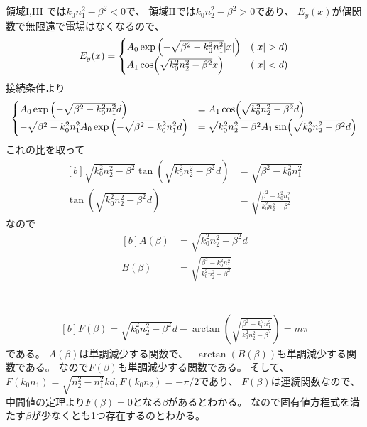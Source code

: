 \documentclass[../ap_2013.tex]{subfiles}
\begin{document}
\section{}
領域I,III では\(k_0n_1^2-\beta^2 <0\)で、
領域IIでは\(k_0n_2^2-\beta^2 >0\)であり、
\(E_y(x)\)が偶関数で無限遠で電場はなくなるので、
\begin{equation}\begin{aligned}[b]
    E_y(x) =
    \begin{cases}
        A_0\exp\qty(-\sqrt{\beta^2-k_0^2n_1^2}\abs{x})& (\abs{x}>d)\\
        A_1\cos(\sqrt{k_0^2n_2^2-\beta^2}x) & (\abs{x}<d)
    \end{cases}
\end{aligned}\end{equation}
接続条件より
\begin{equation}\begin{aligned}[b]
    \begin{cases}
        A_0\exp\qty(-\sqrt{\beta^2-k_0^2n_1^2}d) &= A_1\cos(\sqrt{k_0^2n_2^2-\beta^2}d)\\
        -\sqrt{\beta^2-k_0^2n_1^2}A_0\exp\qty(-\sqrt{\beta^2-k_0^2n_1^2}d) &= \sqrt{k_0^2n_2^2-\beta^2}A_1\sin(\sqrt{k_0^2n_2^2-\beta^2}d)
    \end{cases}
\end{aligned}\end{equation}
これの比を取って
\begin{equation}\begin{aligned}[b]
    \sqrt{k_0^2n_2^2-\beta^2}\tan(\sqrt{k_0^2n_2^2-\beta^2}d) &=\sqrt{\beta^2-k_0^2n_1^2}\\
    \tan(\sqrt{k_0^2n_2^2-\beta^2}d) &= \sqrt{\frac{\beta^2-k_0^2n_1^2}{k_0^2n_2^2-\beta^2}}
\end{aligned}\end{equation}
なので
\begin{equation}\begin{aligned}[b]
    A(\beta) &= \sqrt{k_0^2n_2^2-\beta^2}d\\
    B(\beta) &= \sqrt{\frac{\beta^2-k_0^2n_1^2}{k_0^2n_2^2-\beta^2}}
\end{aligned}\end{equation}

\section{}
\begin{equation}\begin{aligned}[b]
    F(\beta) = \sqrt{k_0^2n_2^2-\beta^2}d -\arctan(\sqrt{\frac{\beta^2-k_0^2n_1^2}{k_0^2n_2^2-\beta^2}}) = m\pi
\end{aligned}\end{equation}
である。
\(A(\beta)\)は単調減少する関数で、\(-\arctan(B(\beta))\)も単調減少する関数である。
なので\(F(\beta)\)も単調減少する関数である。
そして、\(F(k_0n_1)=\sqrt{n_2^2-n_1^2}kd, F(k_0n_2)=-\pi/2\)であり、
\(F(\beta)\)は連続関数なので、中間値の定理より\(F(\beta)=0\)となる\(\beta\)があるとわかる。
なので固有値方程式を満たす\(\beta\)が少なくとも1つ存在するのとわかる。
\end{document}
